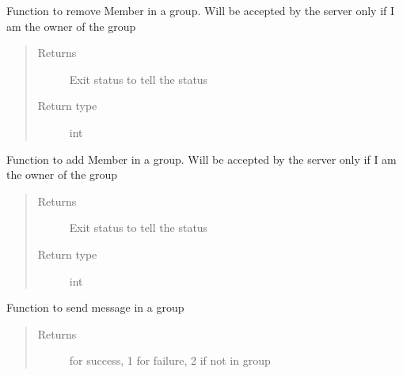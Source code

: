 \documentclass[letterpaper,10pt,english]{sphinxmanual}
\begin{document}
\begin{fulllineitems}
\begin{fulllineitems}
\label{\detokenize{Message:Message.Message._remove_member_from_group}}
Function to remove Member in a group. Will be accepted by the server only if I am the owner of the group
\begin{quote}\begin{description}
\item[{Returns}] \leavevmode
Exit status to tell the status

\item[{Return type}] \leavevmode
int

\end{description}\end{quote}

\end{fulllineitems}


\begin{fulllineitems}
\label{\detokenize{Message:Message.Message._add_member_in_group}}
Function to add Member in a group. Will be accepted by the server only if I am the owner of the group
\begin{quote}\begin{description}
\item[{Returns}] \leavevmode
Exit status to tell the status

\item[{Return type}] \leavevmode
int

\end{description}\end{quote}

\end{fulllineitems}


\begin{fulllineitems}
\label{\detokenize{Message:Message.Message._send_message_in_group}}
Function to send message in a group
\begin{quote}\begin{description}
\item[{Returns}]  for success, 1 for failure, 2 if not in group


\end{description}
\end{quote}
\end{fulllineitems}
\end{fulllineitems}
\end{document}
